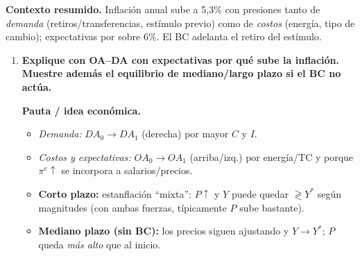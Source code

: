 \documentclass[11pt,addpoints]{article}
\begin{document}
\textbf{Contexto resumido.} Inflación anual sube a 5{,}3\% con presiones tanto de \emph{demanda} (retiros/transferencias, estímulo previo) como de \emph{costos} (energía, tipo de cambio); expectativas por sobre 6\%. El BC adelanta el retiro del estímulo.

\begin{enumerate}[label=\alph*)]

\item \textbf{Explique con OA–DA con expectativas por qué sube la inflación. Muestre además el equilibrio de mediano/largo plazo si el BC no actúa.}

\textbf{Pauta / idea económica.}
\begin{itemize}
\item \emph{Demanda:} \(DA_0\to DA_1\) (derecha) por mayor \(C\) y \(I\).
\item \emph{Costos y expectativas:} \(OA_0\to OA_1\) (arriba/izq.) por energía/TC y porque \(\pi^e\uparrow\) se incorpora a salarios/precios.
\item \textbf{Corto plazo:} estanflación “mixta”: \(P\uparrow\) y \(Y\) puede quedar \(\gtrless Y^*\) según magnitudes (con ambas fuerzas, típicamente \(P\) sube bastante).
\item \textbf{Mediano plazo (sin BC):} los precios siguen ajustando y \(Y\to Y^*\); \(\boxed{P}\) queda \emph{más alto} que al inicio.
\end{itemize}


\end{enumerate}
\end{document}
